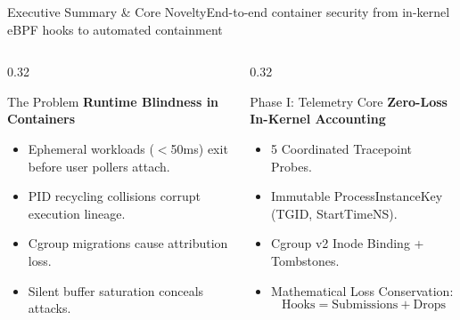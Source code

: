 \documentclass[aspectratio=169,10pt]{beamer}
\begin{document}
\begin{frame}{Executive Summary \& Core Novelty}{End-to-end container security from in-kernel eBPF hooks to automated containment}
  \begin{columns}[T]
    \begin{column}{0.32\textwidth}
      \begin{alertblock}{The Problem}
        \scriptsize
        \textbf{Runtime Blindness in Containers}
        \begin{itemize}
          \item Ephemeral workloads ($<$50ms) exit before user pollers attach.
          \item PID recycling collisions corrupt execution lineage.
          \item Cgroup migrations cause attribution loss.
          \item Silent buffer saturation conceals attacks.
        \end{itemize}
      \end{alertblock}
    \end{column}

    \begin{column}{0.32\textwidth}
      \begin{block}{Phase I: Telemetry Core}
        \scriptsize
        \textbf{Zero-Loss In-Kernel Accounting}
        \begin{itemize}
          \item 5 Coordinated Tracepoint Probes.
          \item Immutable ProcessInstanceKey (TGID, StartTimeNS).
          \item Cgroup v2 Inode Binding + Tombstones.
          \item Mathematical Loss Conservation:
            $$\text{Hooks} = \text{Submissions} + \text{Drops}$$
        \end{itemize}
      \end{block}
    \end{column}


\end{columns}
\end{frame}
\end{document}

